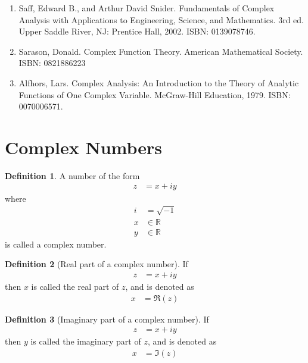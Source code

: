 \documentclass[titlepage, fleqn, a4paper, 12pt, twoside]{article}
\theoremstyle{definition}
\newtheorem{definition}{Definition}
\theoremstyle{theorem}
\begin{document}
\begin{enumerate}
	\item Saff, Edward B., and Arthur David Snider. Fundamentals of Complex Analysis with Applications to Engineering, Science, and Mathematics. 3rd ed. Upper Saddle River, NJ: Prentice Hall, 2002. ISBN: 0139078746.
	\item Sarason, Donald. Complex Function Theory. American Mathematical Society. ISBN: 0821886223
	\item Alfhors, Lars. Complex Analysis: An Introduction to the Theory of Analytic Functions of One Complex Variable. McGraw-Hill Education, 1979. ISBN: 0070006571.
\end{enumerate}

\newpage
{}
\part{Complex Numbers}

\begin{definition}
	A number of the form
	\begin{align*}
		z & = x + i y
	\end{align*}
	where
	\begin{align*}
		i & = \sqrt{-1}    \\
		x & \in \mathbb{R} \\
		y & \in \mathbb{R}
	\end{align*}
	is called a complex number.
\end{definition}

\begin{definition}[Real part of a complex number]
	If
	\begin{align*}
		z & = x + i y
	\end{align*}
	then $x$ is called the real part of $z$, and is denoted as
	\begin{align*}
		x & = \Re(z)
	\end{align*}
\end{definition}

\begin{definition}[Imaginary part of a complex number]
	If
	\begin{align*}
		z & = x + i y
	\end{align*}
	then $y$ is called the imaginary part of $z$, and is denoted as
	\begin{align*}
		x & = \Im(z)
	\end{align*}
\end{definition}
\end{document}

